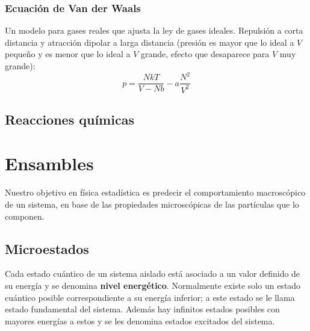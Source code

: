 \documentclass[]{article}
\numberwithin{equation}{section}
\newcommand{\0}{\textcolor{gray}{0}}
\begin{document}
\subsubsection{Ecuación de Van der Waals}
Un modelo para gases reales que ajusta la ley de gases ideales. Repulsión a corta distancia y atracción dipolar a larga distancia (presión es mayor que lo ideal a \(V\) pequeño y es menor que lo ideal a \(V\) grande, efecto que desaparece para \(V\) muy grande):
\begin{equation}
	p = \frac{NkT}{V - Nb} - a\frac{N^2}{V^2}
\end{equation}

\subsection{Reacciones químicas}

\section{Ensambles}
Nuestro objetivo en física estadística es predecir el comportamiento macroscópico de un sistema, en base de las propiedades microscópicas de las partículas que lo componen.
\subsection{Microestados}
Cada estado cuántico de un sistema aislado está asociado a un valor definido de su energía y se denomina \textbf{nivel energético}. Normalmente existe solo un estado cuántico posible correspondiente a su energía inferior; a este estado se le llama estado fundamental del sistema. Además hay infinitos estados posibles con mayores energías a estos y se les denomina estados excitados del sistema.
\end{document}
